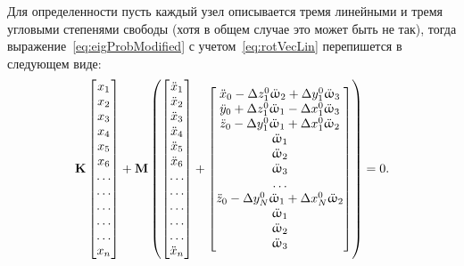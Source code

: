 Для определенности пусть каждый узел описывается тремя линейными и тремя угловыми степенями свободы (хотя в общем случае это может быть не так), тогда выражение~\eqref{eq:eigProbModified} с учетом~\eqref{eq:rotVecLin} перепишется в следующем виде:
\begin{equation}
	\mathbf{K}
	\begin{bmatrix}
	x_1 \\ x_2 \\ x_3 \\ x_4 \\ x_5 \\ x_6 \\
	\hdots \\ \hdots \\ \hdots \\ \hdots \\ \hdots \\
	x_n
	\end{bmatrix}
	 + \mathbf{M} \left(
	\begin{bmatrix}
	\ddot{x}_1 \\ \ddot{x}_2 \\ \ddot{x}_3 \\ \ddot{x}_4 \\ \ddot{x}_5 \\ \ddot{x}_6 \\
	\hdots \\ \hdots \\ \hdots \\ \hdots \\ \hdots \\
	\ddot{x}_n
	\end{bmatrix}
	 +
	 \begin{bmatrix}
		\ddot{x}_0 - \Delta z_1^0 \ddot{\upomega}_2 + \Delta y_1^0 \ddot{\upomega}_3 \\
		\ddot{y}_0 + \Delta z_1^0 \ddot{\upomega}_1 - \Delta x_1^0 \ddot{\upomega}_3 \\
		\ddot{z}_0 -\Delta y_1^0 \ddot{\upomega}_1 + \Delta x_1^0 \ddot{\upomega}_2 \\
		\ddot{\upomega}_1 \\
		\ddot{\upomega}_2	\\
		\ddot{\upomega}_3 \\
		\hdots \\
		\ddot{z}_0 -\Delta y_N^0 \ddot{\upomega}_1 + \Delta x_N^0 \ddot{\upomega}_2 \\
		\ddot{\upomega}_1 \\
		\ddot{\upomega}_2	\\
		\ddot{\upomega}_3 \\
	 \end{bmatrix}
	 \right) = 0.
	 \label{eq:motionModified}
\end{equation}


